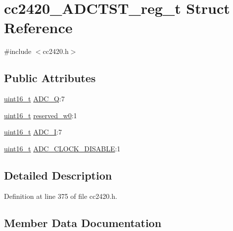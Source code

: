 \hypertarget{structcc2420___a_d_c_t_s_t__reg__t}{}\section{cc2420\+\_\+\+A\+D\+C\+T\+S\+T\+\_\+reg\+\_\+t Struct Reference}
\label{structcc2420___a_d_c_t_s_t__reg__t}


{\ttfamily \#include $<$cc2420.\+h$>$}

\subsection*{Public Attributes}
\begin{DoxyCompactItemize}
\item 
\hyperlink{_p_e___types_8h_a1f1825b69244eb3ad2c7165ddc99c956}{uint16\+\_\+t} \hyperlink{structcc2420___a_d_c_t_s_t__reg__t_a40887db90b3f5ecd9e754e22c0c29fe4}{A\+D\+C\+\_\+Q}\+:7
\item 
\hyperlink{_p_e___types_8h_a1f1825b69244eb3ad2c7165ddc99c956}{uint16\+\_\+t} \hyperlink{structcc2420___a_d_c_t_s_t__reg__t_a4e03ff5412d3ba321492b2aeb52021f7}{reserved\+\_\+w0}\+:1
\item 
\hyperlink{_p_e___types_8h_a1f1825b69244eb3ad2c7165ddc99c956}{uint16\+\_\+t} \hyperlink{structcc2420___a_d_c_t_s_t__reg__t_a1610157a2842c74bf3a0a15e2882c0ae}{A\+D\+C\+\_\+I}\+:7
\item 
\hyperlink{_p_e___types_8h_a1f1825b69244eb3ad2c7165ddc99c956}{uint16\+\_\+t} \hyperlink{structcc2420___a_d_c_t_s_t__reg__t_a86c048161802ba91cace98d4bb4f5de4}{A\+D\+C\+\_\+\+C\+L\+O\+C\+K\+\_\+\+D\+I\+S\+A\+B\+LE}\+:1
\end{DoxyCompactItemize}


\subsection{Detailed Description}


Definition at line 375 of file cc2420.\+h.



\subsection{Member Data Documentation}
